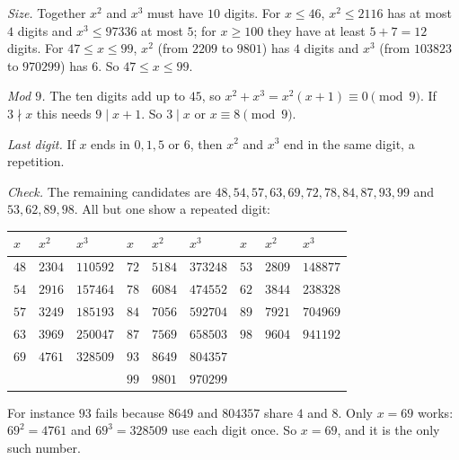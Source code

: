 \emph{Size.} Together $x^2$ and $x^3$ must have $10$ digits. For $x\le46$, $x^2\le2116$ has at most $4$ digits and $x^3\le97336$ at most $5$; for $x\ge100$ they have at least $5+7=12$ digits. For $47\le x\le99$, $x^2$ (from $2209$ to $9801$) has $4$ digits and $x^3$ (from $103823$ to $970299$) has $6$. So $47\le x\le99$.

\emph{Mod $9$.} The ten digits add up to $45$, so $x^2+x^3=x^2(x+1)\equiv0\pmod9$. If $3\nmid x$ this needs $9\mid x+1$. So $3\mid x$ or $x\equiv8\pmod9$.

\emph{Last digit.} If $x$ ends in $0,1,5$ or $6$, then $x^2$ and $x^3$ end in the same digit, a repetition.

\emph{Check.} The remaining candidates are $48,54,57,63,69,72,78,84,87,93,99$ and $53,62,89,98$. All but one show a repeated digit:
\begin{center}
\begin{tabular}{lll|lll|lll}
$x$&$x^2$&$x^3$&$x$&$x^2$&$x^3$&$x$&$x^2$&$x^3$\\\hline
$48$&$2304$&$110592$&$72$&$5184$&$373248$&$53$&$2809$&$148877$\\
$54$&$2916$&$157464$&$78$&$6084$&$474552$&$62$&$3844$&$238328$\\
$57$&$3249$&$185193$&$84$&$7056$&$592704$&$89$&$7921$&$704969$\\
$63$&$3969$&$250047$&$87$&$7569$&$658503$&$98$&$9604$&$941192$\\
$69$&$4761$&$328509$&$93$&$8649$&$804357$&&&\\
&&&$99$&$9801$&$970299$&&&
\end{tabular}
\end{center}
For instance $93$ fails because $8649$ and $804357$ share $4$ and $8$. Only $x=69$ works: $69^2=4761$ and $69^3=328509$ use each digit once. So $x=\boxed{69}$, and it is the only such number.
